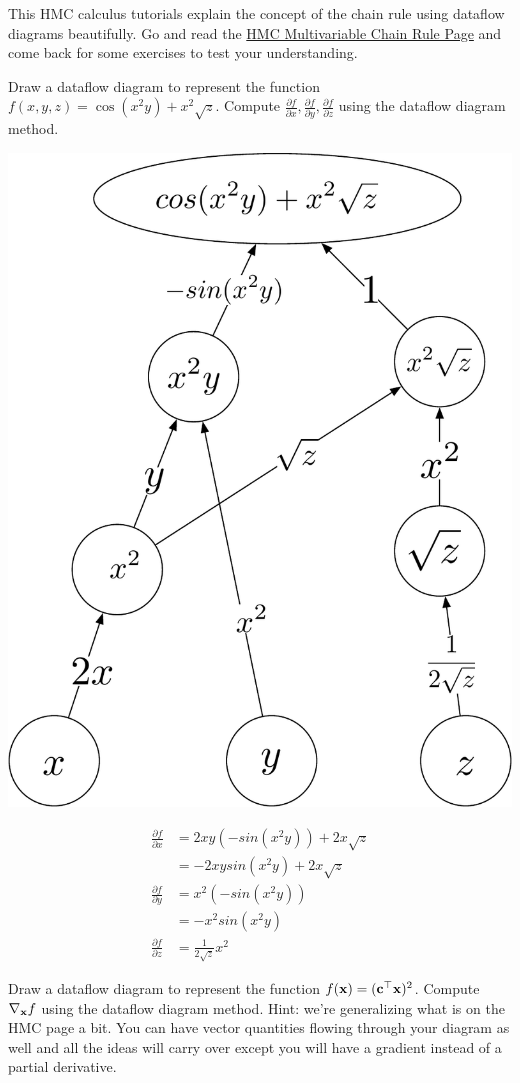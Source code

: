 \documentclass[assignment06_Solutions]{subfiles}
\begin{document}
\begin{externalresources}[(20 minutes)]
This HMC calculus tutorials explain the concept of the chain rule using dataflow diagrams beautifully.  Go and read the \href{https://www.math.hmc.edu/calculus/tutorials/multichainrule/}{HMC Multivariable Chain Rule Page} and come back for some exercises to test your understanding.
\end{externalresources}

\begin{exercise}[(20 minutes)]
\bes
\item Draw a dataflow diagram to represent the function $f(x,y,z) = \cos(x^2 y) + x^2 \sqrt{z}$.  Compute $\frac{\partial f}{\partial x}, \frac{\partial f}{\partial y}, \frac{\partial f}{\partial z}$ using the dataflow diagram method.
\begin{boxedsolution}
\begin{center}
\includegraphics[width=0.5\linewidth]{figures/3asolution}
\end{center}
\begin{align}
\frac{\partial f}{\partial x}&= 2x y (-sin(x^2 y)) + 2x{\sqrt z} \nonumber \\
&= -2x y sin(x^2 y) + 2x{\sqrt z} \\
\frac{\partial f}{\partial y} &= x^2 (-sin(x^2 y)) \nonumber \\
&= -x^2 sin(x^2 y) \\
\frac{\partial f}{\partial z} &= \frac{1}{2 \sqrt z} x^2
\end{align}
\end{boxedsolution}
\item Draw a dataflow diagram to represent the function $f(\mathbf{x}) = (\mathbf{c}^\top \mathbf{x})^2$.  Compute $\nabla_{\mathbf{x}} f$ using the dataflow diagram method.  Hint: we're generalizing what is on the HMC page a bit.  You can have vector quantities flowing through your diagram as well and all the ideas will carry over except you will have a gradient instead of a partial derivative.

\end{exercise}
\end{document}
